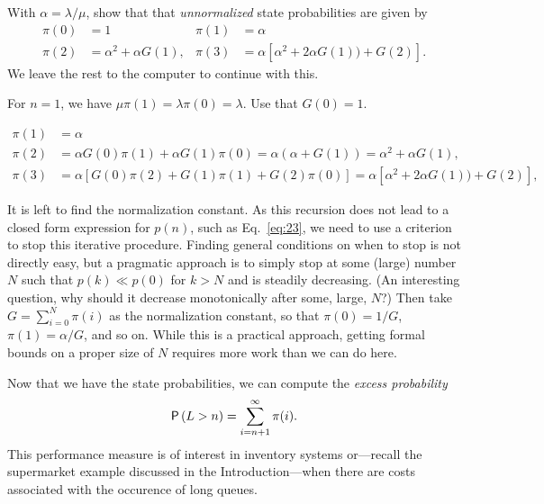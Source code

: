 \begin{exercise}\label{ex:13}
With $\alpha = \lambda/\mu$,  show that that \emph{unnormalized} state probabilities are given by
\begin{align*}
\pi(0) & = 1 &
  \pi(1) &= \alpha \\
  \pi(2) &= \alpha^2 + \alpha G(1), &
  \pi(3) &= \alpha[ \alpha^2 + 2 \alpha G(1)) + G(2)].
\end{align*}
We leave the rest to the computer to continue with this.
\begin{hint}
For $n=1$, we have
$\mu \pi(1) = \lambda \pi(0)=\lambda$. Use that $G(0)=1$.
\end{hint}
\begin{solution}
\begin{equation*}
  \begin{split}
  \pi(1) &= \alpha \\
  \pi(2) &= \alpha G(0) \pi(1) + \alpha G(1) \pi(0) =\alpha(\alpha+ G(1)) = \alpha^2 + \alpha G(1), \\
  \pi(3) 
&= \alpha[G(0) \pi(2) + G(1) \pi(1) + G(2) \pi(0)]  = \alpha[ \alpha^2 + 2 \alpha G(1)) + G(2)],
  \end{split}
\end{equation*}
\end{solution}  
\end{exercise}

It is left to find the normalization constant.  As this recursion does
not lead to a closed form expression for $p(n)$, such as
Eq.~\eqref{eq:23}, we need to use a criterion to stop this iterative
procedure. Finding general conditions on when to stop is not directly
easy, but a pragmatic approach is to simply stop at some (large)
number $N$ such that $p(k)\ll p(0)$ for $k>N$ and is steadily decreasing. (An interesting question, why should it decrease monotonically after some, large, $N$?)
Then take $G=\sum_{i=0}^N \pi(i)$ as the normalization
constant, so that $\pi(0)=1/G$, $\pi(1)=\alpha/G$, and so on.
While this is a practical approach, getting formal bounds on a proper size of $N$ requires more work than we can do here.

Now that we have the state probabilities, we can compute the \emph{excess probability}
\begin{equation}
  \P{L> n } = \sum_{i=n+1}^\infty \pi(i).
\end{equation}
This performance measure is  of interest in inventory systems or---recall the supermarket example discussed in the Introduction---when there are costs associated with the occurence of long queues. 

